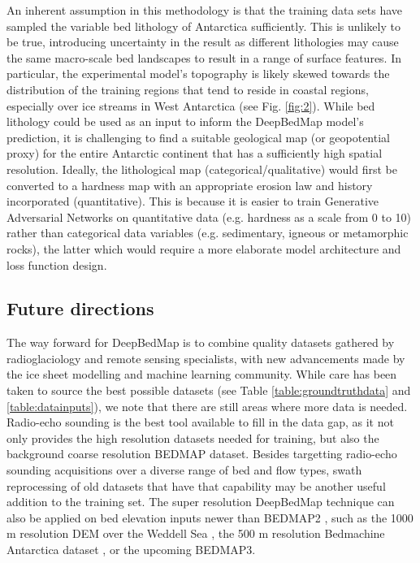 \documentclass[tc, manuscript]{copernicus}
\begin{document}
An inherent assumption in this methodology is that the training data sets have sampled the variable bed lithology of Antarctica \citep{CoxGeoMAPdatasetAntarctic2018} sufficiently.
This is unlikely to be true, introducing uncertainty in the result as different lithologies may cause the same macro-scale bed landscapes to result in a range of surface features.
In particular, the experimental model's topography is likely skewed towards the distribution of the training regions that tend to reside in coastal regions, especially over ice streams in West Antarctica (see Fig. \ref{fig:2}).
While bed lithology could be used as an input to inform the DeepBedMap model's prediction, it is challenging to find a suitable geological map (or geopotential proxy) \citep[see e.g.][]{AitkensubglacialgeologyWilkes2014,CoxGeoMAPdatasetAntarctic2018} for the entire Antarctic continent that has a sufficiently high spatial resolution.
Ideally, the lithological map (categorical/qualitative) would first be converted to a hardness map with an appropriate erosion law and history incorporated (quantitative).
This is because it is easier to train Generative Adversarial Networks on quantitative data (e.g. hardness as a scale from 0 to 10) rather than categorical data variables (e.g. sedimentary, igneous or metamorphic rocks), the latter which would require a more elaborate model architecture and loss function design.

\subsection{Future directions} \label{section:futuredirections}

The way forward for DeepBedMap is to combine quality datasets gathered by radioglaciology and remote sensing specialists, with new advancements made by the ice sheet modelling and machine learning community.
While care has been taken to source the best possible datasets (see Table \ref{table:groundtruthdata} and \ref{table:datainputs}), we note that there are still areas where more data is needed.
Radio-echo sounding is the best tool available to fill in the data gap, as it not only provides the high resolution datasets needed for training, but also the background coarse resolution BEDMAP dataset.
Besides targetting radio-echo sounding acquisitions over a diverse range of bed and flow types, swath reprocessing of old datasets that have that capability \citep{HolschuhLinkingpostglaciallandscapes2020} may be another useful addition to the training set.
The super resolution DeepBedMap technique can also be applied on bed elevation inputs newer than BEDMAP2 \citep{FretwellBedmap2improvedice2013}, such as the 1000 m resolution DEM over the Weddell Sea \citep{Jeofry1KmBedTopography2017}, the 500 m resolution Bedmachine Antarctica dataset \citep{MorlighemMEaSUREsBedMachineAntarctica2019}, or the upcoming BEDMAP3.
\end{document}
